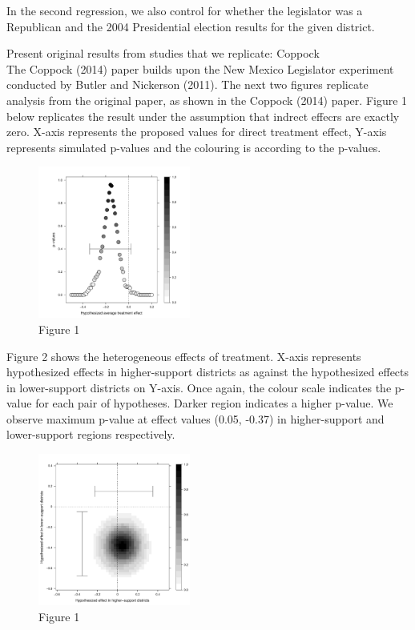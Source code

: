 \documentclass[12pt]{article}
\begin{document}


In the second regression, we also control for whether the legislator was a Republican and the 2004 Presidential election results for the given district.




Present original results from studies that we replicate: Coppock \\

The Coppock (2014) paper builds upon the New Mexico Legislator experiment conducted by Butler and Nickerson (2011). The next two figures replicate analysis from the original paper, as shown in the Coppock (2014) paper. Figure 1 below replicates the result under the assumption that indrect effecrs are exactly zero. X-axis represents the proposed values for direct treatment effect, Y-axis represents simulated p-values and the colouring is according to the p-values.


\begin{figure}[H]
\centering
\includegraphics[height=5cm]{images/CoppockJEPS_figure1a.pdf}
\caption{Figure 1}
\end{figure}


Figure 2 shows the heterogeneous effects of treatment. X-axis represents hypothesized effects in higher-support districts as against the hypothesized effects in lower-support districts on Y-axis. Once again, the colour scale indicates the p-value for each pair of hypotheses. Darker region indicates a higher p-value. We observe maximum p-value at effect values (0.05, -0.37) in higher-support and lower-support regions respectively.


\begin{figure}[H]
\centering
\includegraphics[height=5cm]{images/CoppockJEPS_figure1b.pdf}
\caption{Figure 1}
\end{figure}
\end{document}
